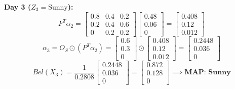\documentclass{article}
\begin{document}
\begin{enumerate}
    \textbf{Day 3 ($Z_3 = \text{Sunny}$):}
    $$ P^T \alpha_2 = \begin{bmatrix} 0.8 & 0.4 & 0.2 \\ 0.2 & 0.4 & 0.6 \\ 0 & 0.2 & 0.2 \end{bmatrix} \begin{bmatrix} 0.48 \\ 0.06 \\ 0 \end{bmatrix} = \begin{bmatrix} 0.408 \\ 0.12 \\ 0.012 \end{bmatrix} $$
    $$ \alpha_3 = O_S \odot (P^T \alpha_2) = \begin{bmatrix} 0.6 \\ 0.3 \\ 0 \end{bmatrix} \odot \begin{bmatrix} 0.408 \\ 0.12 \\ 0.012 \end{bmatrix} = \begin{bmatrix} 0.2448 \\ 0.036 \\ 0 \end{bmatrix} $$
    $$ Bel(X_3) = \frac{1}{0.2808} \begin{bmatrix} 0.2448 \\ 0.036 \\ 0 \end{bmatrix} = \begin{bmatrix} 0.872 \\ 0.128 \\ 0 \end{bmatrix} \implies \textbf{MAP: Sunny} $$


\end{enumerate}
\end{document}
